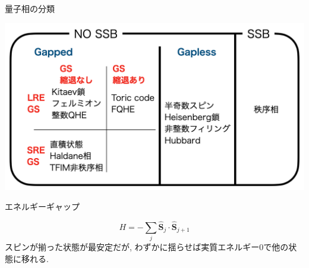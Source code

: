\documentclass[dvipdfm]{beamer}
\begin{document}
\begin{frame}{量子相の分類}
    \begin{center}
        \includegraphics[width=\linewidth]{phase-diag.png}
    \end{center}
\end{frame}

\begin{frame}{エネルギーギャップ}
    \begin{example}
        \begin{equation*}
            H=-\sum_j\hat{\bm{S}}_j\cdot\hat{\bm{S}}_{j+1}
        \end{equation*}
        スピンが揃った状態が最安定だが, わずかに揺らせば実質エネルギー0で他の状態に移れる. 
        \begin{figure}
            \centering
        \end{figure}
    \end{example}
    \alert{}
\end{frame}
\end{document}
